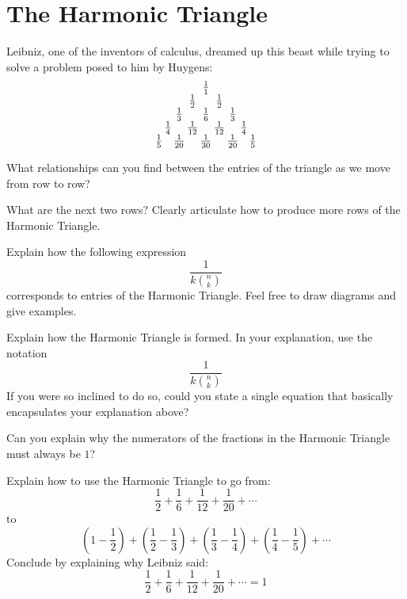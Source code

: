 \newpage
\activity\section{The Harmonic Triangle} 

Leibniz, one of the inventors of calculus, dreamed up this beast while
trying to solve a problem posed to him by Huygens:
\[
\begin{tabular}{@{\,}c@{\,}c@{\,}c@{\,}c@{\,}c@{\,}c@{\,}c@{\,}c@{\,}c@{\,}}
& & & & $\frac{1}{1}$ & & & & \\
& & & $\frac{1}{2}$ & & $\frac{1}{2}$ & & & \\
& & $\frac{1}{3}$ & & $\frac{1}{6}$ & & $\frac{1}{3}$ & & \\
& $\frac{1}{4}$ & & $\frac{1}{12}$ & & $\frac{1}{12}$ & & $\frac{1}{4}$ &\\
$\frac{1}{5}$ & & $\frac{1}{20}$ & & $\frac{1}{30}$ & & $\frac{1}{20}$ & & $\frac{1}{5}$
\end{tabular}
\]

\begin{prob} 
What relationships can you find between the entries of the triangle as
we move from row to row?
\end{prob}


\begin{prob} What are the next two rows? Clearly articulate how to produce more rows of the Harmonic Triangle.
\end{prob}

\begin{prob} Explain how the following expression
\[
\frac{1}{k\binom{n}{k}}
\]
corresponds to entries of the Harmonic Triangle. Feel free to draw
diagrams and give examples.
\end{prob}

\begin{prob}  
Explain how the Harmonic Triangle is formed. In your explanation, use
the notation
\[
\frac{1}{k\binom{n}{k}}
\]
If you were so inclined to do so, could you state a single equation
that basically encapsulates your explanation above?
\end{prob}

\begin{prob} 
Can you explain why the numerators of the fractions in the Harmonic
Triangle must always be $1$?
\end{prob}


\begin{prob} Explain how to use the Harmonic Triangle to go from:
\[
\frac{1}{2} + \frac{1}{6} + \frac{1}{12} + \frac{1}{20}+\cdots
\]
to
\[
\left(1 - \frac{1}{2}\right) + \left(\frac{1}{2}-\frac{1}{3}\right) + 
\left(\frac{1}{3}- \frac{1}{4}\right) + \left(\frac{1}{4}-\frac{1}{5}\right) + \cdots 
\]
Conclude by explaining why Leibniz said:
\[
\frac{1}{2} + \frac{1}{6} + \frac{1}{12} + \frac{1}{20}+\cdots = 1
\]
\end{prob}


